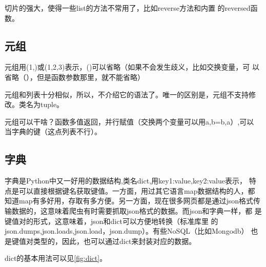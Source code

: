 \documentclass[11pt,UTF8,oneside]{mybook}
\begin{document}
切片的强大，使得一些list的方法不常用了，比如reverse方法和内置
的reversed函数。




\subsection{元组}
\label{sec:tuple}

元组用(1,)或(1,2,3)表示，()可以省略（如果不会发生歧义，比如交换变量，可
以省略（），但是函数参数那里，就不能省略）

元组和列表十分相似，所以，不介绍它的语法了。唯一的区别是，元组不支持修
改。类名为tuple。

元组可以干啥？函数多值返回，并行赋值（交换两个变量可以用a,b=b,a）,可以
当字典的键（这点列表不行）。

\subsection{字典}
\label{sec:dict}

字典是Python中又一好用的数据结构,类名dict,用{key1:value,key2:value}表示，
特点是可以直接根据键名获取键值。一方面，用过其它语言map数据结构的人，都
知道map有多好用，存取有多方便。另一方面，现在很多网页都是通过json格式传
输数据的，这意味着爬虫有时需要抓取json格式的数据。而json和字典一样，都
是键值对的形式，这意味着，json和dict可以方便地转换（标准库里
的json.dumps,json.loads,json.load，json.dump）。有些NoSQL（比如Mongodb）
也是键值对类型的，因此，也可以通过dict来封装对应的数据。


dict的基本用法可以见\autoref{fig:dict}。
\end{document}
